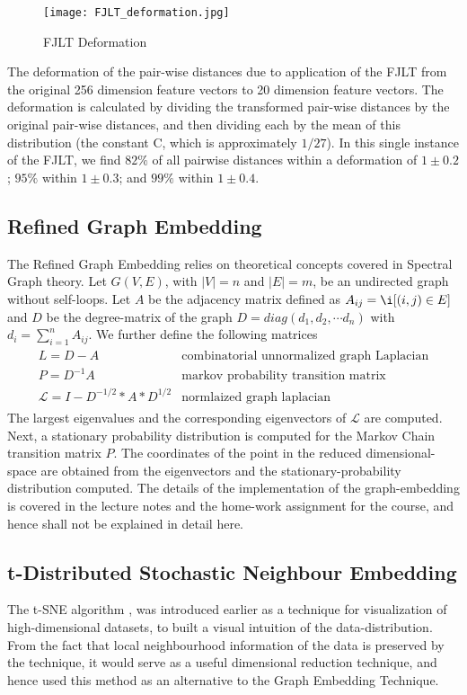 \documentclass[10pt]{article}
\begin{document}
\begin{figure}[h!]
\centering
\texttt{[image: FJLT\_deformation.jpg]}\\
\caption{FJLT Deformation}
\label{fig:fjlt_deformation}
\end{figure}

The deformation of the pair-wise distances due to application of the FJLT from the original 256 dimension feature vectors to 20 dimension feature vectors.  The deformation is calculated by dividing the transformed pair-wise distances by the original pair-wise distances, and then dividing each by the mean of this distribution (the constant C, which is approximately $1/27$).  In this single instance of the FJLT, we find $82\%$ of all pairwise distances within a deformation of $1 \pm 0.2$;   $95\%$ within $1 \pm 0.3$;  and $99\%$ within $1 \pm 0.4$.   


\subsection{Refined Graph Embedding}
The Refined Graph Embedding relies on theoretical concepts covered in Spectral Graph theory. Let $G(V,E)$, with $|V| = n$ and $|E| = m $, be an undirected graph without self-loops. Let $A$ be the adjacency matrix defined as $A_{ij} = \i[(i,j) \in E]$ and $D$ be the degree-matrix of the graph $D = diag(d_1, d_2, \cdots d_n)$ with $d_i = \sum_{i=1}^n A_{ij}$. We further define the following matrices
\begin{align}
\begin{array}{cc}
L = D-A & \text{combinatorial unnormalized graph Laplacian}\\
P = D^{-1}A & \text{markov probability transition matrix}\\
\mathcal{L} = I - D^{-1/2}*A*D^{1/2} & \text{normlaized graph laplacian}
\end{array}
\end{align}
The largest eigenvalues and the corresponding eigenvectors of $\mathcal{L}$ are computed. Next, a stationary probability distribution is computed for the Markov Chain transition matrix $P$. The coordinates of the point in the reduced dimensional-space are obtained from the eigenvectors and the stationary-probability distribution computed. 
The details of the implementation of the graph-embedding is covered in the lecture notes \cite{fmeyer} and the home-work assignment for the course, and hence shall not be explained in detail here. 

\subsection{t-Distributed Stochastic Neighbour Embedding}
The t-SNE algorithm \cite{tSNEdataViz}, was introduced earlier as a technique for visualization of high-dimensional datasets, to built a visual intuition of the data-distribution. From the fact that local neighbourhood information of the data is preserved by the technique, it would serve as a useful dimensional reduction technique, and hence used this method as an alternative to the Graph Embedding Technique.
\end{document}

